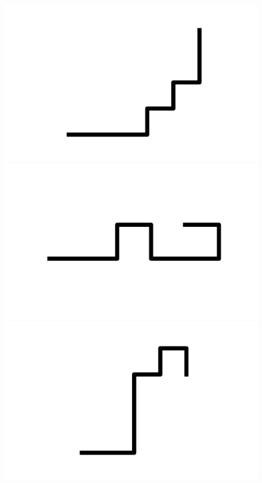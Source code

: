 \documentclass[]{report}
\begin{document}
\includegraphics[scale=.1]{pictures/21/state_cluster_shapes_481.pdf} 
\includegraphics[scale=.1]{pictures/21/state_cluster_shapes_482.pdf} 
\includegraphics[scale=.1]{pictures/21/state_cluster_shapes_483.pdf} 
\end{document}
